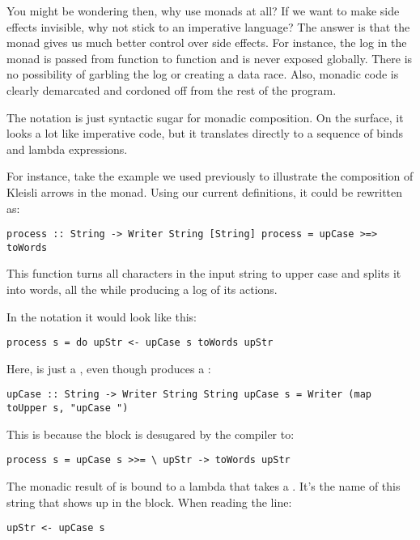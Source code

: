 You might be wondering then, why use monads at all? If we want to make
side effects invisible, why not stick to an imperative language? The
answer is that the monad gives us much better control over side effects.
For instance, the log in the  monad is passed from
function to function and is never exposed globally. There is no
possibility of garbling the log or creating a data race. Also, monadic
code is clearly demarcated and cordoned off from the rest of the
program.

The  notation is just syntactic sugar for monadic
composition. On the surface, it looks a lot like imperative code, but it
translates directly to a sequence of binds and lambda expressions.

For instance, take the example we used previously to illustrate the
composition of Kleisli arrows in the  monad. Using our
current definitions, it could be rewritten as:

\begin{verbatim}
process :: String -> Writer String [String] process = upCase >=> toWords
\end{verbatim}

This function turns all characters in the input string to upper case and
splits it into words, all the while producing a log of its actions.

In the  notation it would look like this:

\begin{verbatim}
process s = do upStr <- upCase s toWords upStr
\end{verbatim}

Here,  is just a , even though
 produces a :

\begin{verbatim}
upCase :: String -> Writer String String upCase s = Writer (map toUpper s, "upCase ")
\end{verbatim}

This is because the  block is desugared by the compiler to:

\begin{verbatim}
process s = upCase s >>= \ upStr -> toWords upStr
\end{verbatim}

The monadic result of  is bound to a lambda that takes a
. It's the name of this string that shows up in the
 block. When reading the line:

\begin{verbatim}
upStr <- upCase s
\end{verbatim}

